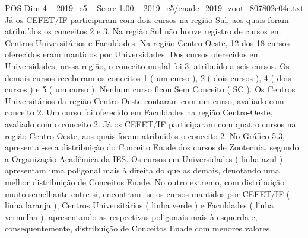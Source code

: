 \begin{textsample}{POS Dim 4 – 2019\_c5 – Score 1.00 – 2019\_c5/enade\_2019\_zoot\_807802c04e.txt}
Já os CEFET/IF participaram com dois cursos na região Sul, aos quais foram atribuídos os conceitos 2 e 3.
Na região Sul não houve registro de cursos em Centros Universitários e Faculdades.
Na região Centro-Oeste, 12 dos 18 cursos oferecidos eram mantidos por Universidades.
Dos cursos oferecidos em Universidades, nessa região, o conceito modal foi 3, atribuído a seis cursos.
Os demais cursos receberam os conceitos 1 ( um curso ), 2 ( dois cursos ), 4 ( dois cursos ) e 5 ( um curso ).
Nenhum curso ficou Sem Conceito ( SC ).
Os Centros Universitários da região Centro-Oeste contaram com um curso, avaliado com conceito 2.
Um curso foi oferecido em Faculdades na região Centro-Oeste, avaliado com o conceito 2.
Já os CEFET/IF participaram com quatro cursos na região Centro-Oeste, aos quais foram atribuídos o conceito 2.
No Gráfico 5.3, apresenta -se a distribuição do Conceito Enade dos cursos de Zootecnia, segundo a Organização Acadêmica da IES.
Os cursos em Universidades ( linha azul ) apresentam uma poligonal mais à direita do que as demais, denotando uma melhor distribuição de Conceitos Enade.
No outro extremo, com distribuição muito semelhante entre si, encontram -se os cursos mantidos por CEFET/IF ( linha laranja ), Centros Universitários ( linha verde ) e Faculdades ( linha vermelha ), apresentando as respectivas poligonais mais à esquerda e, consequentemente, distribuição de Conceitos Enade com menores valores.

\end{textsample}
